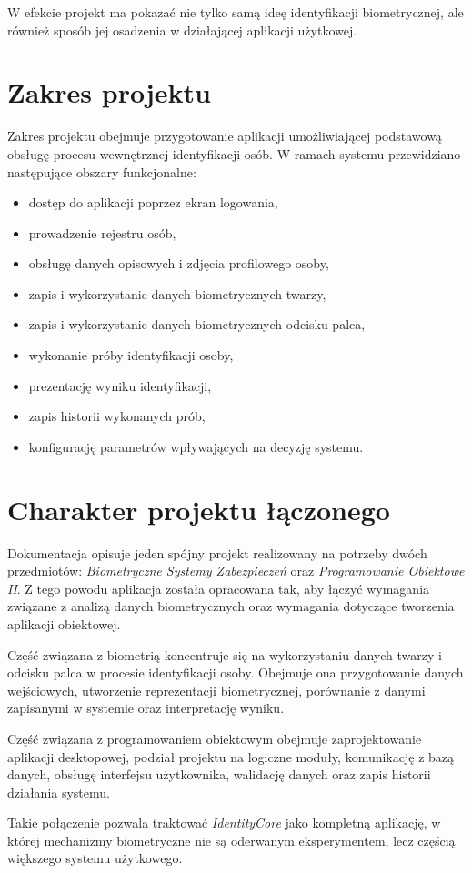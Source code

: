 W efekcie projekt ma pokazać nie tylko samą ideę identyfikacji biometrycznej, ale również sposób jej osadzenia w działającej aplikacji użytkowej.

\section{Zakres projektu}

Zakres projektu obejmuje przygotowanie aplikacji umożliwiającej podstawową obsługę procesu wewnętrznej identyfikacji osób. W ramach systemu przewidziano następujące obszary funkcjonalne:
\begin{itemize}
    \item dostęp do aplikacji poprzez ekran logowania,
    \item prowadzenie rejestru osób,
    \item obsługę danych opisowych i zdjęcia profilowego osoby,
    \item zapis i wykorzystanie danych biometrycznych twarzy,
    \item zapis i wykorzystanie danych biometrycznych odcisku palca,
    \item wykonanie próby identyfikacji osoby,
    \item prezentację wyniku identyfikacji,
    \item zapis historii wykonanych prób,
    \item konfigurację parametrów wpływających na decyzję systemu.
\end{itemize}

\section{Charakter projektu łączonego}

Dokumentacja opisuje jeden spójny projekt realizowany na potrzeby dwóch przedmiotów: \textit{Biometryczne Systemy Zabezpieczeń} oraz \textit{Programowanie Obiektowe II}. Z tego powodu aplikacja została opracowana tak, aby łączyć wymagania związane z analizą danych biometrycznych oraz wymagania dotyczące tworzenia aplikacji obiektowej.

Część związana z biometrią koncentruje się na wykorzystaniu danych twarzy i odcisku palca w procesie identyfikacji osoby. Obejmuje ona przygotowanie danych wejściowych, utworzenie reprezentacji biometrycznej, porównanie z danymi zapisanymi w systemie oraz interpretację wyniku.

Część związana z programowaniem obiektowym obejmuje zaprojektowanie aplikacji desktopowej, podział projektu na logiczne moduły, komunikację z bazą danych, obsługę interfejsu użytkownika, walidację danych oraz zapis historii działania systemu.

Takie połączenie pozwala traktować \textit{IdentityCore} jako kompletną aplikację, w której mechanizmy biometryczne nie są oderwanym eksperymentem, lecz częścią większego systemu użytkowego.